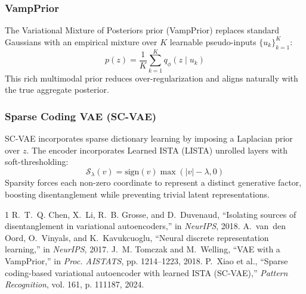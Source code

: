 \documentclass[10pt,journal,compsoc]{IEEEtran}
\begin{document}
\subsubsection{VampPrior}
The Variational Mixture of Posteriors prior (VampPrior) replaces standard Gaussians with an empirical mixture over $K$ learnable pseudo-inputs $\{u_k\}_{k=1}^K$:
\begin{equation}
p(z) = \frac{1}{K} \sum_{k=1}^K q_\phi(z \mid u_k)
\end{equation}
This rich multimodal prior reduces over-regularization and aligns naturally with the true aggregate posterior.

\subsubsection{Sparse Coding VAE (SC-VAE)}
SC-VAE incorporates sparse dictionary learning by imposing a Laplacian prior over $z$. The encoder incorporates Learned ISTA (LISTA) unrolled layers with soft-thresholding:
\begin{equation}
\mathcal{S}_\lambda(v) = \text{sign}(v) \max(|v| - \lambda, 0)
\end{equation}
Sparsity forces each non-zero coordinate to represent a distinct generative factor, boosting disentanglement while preventing trivial latent representations.


\begin{thebibliography}{1}
R.~T.~Q. Chen, X.~Li, R.~B. Grosse, and D.~Duvenaud, ``Isolating sources of disentanglement in variational autoencoders,'' in \emph{NeurIPS}, 2018.
A.~van~den Oord, O.~Vinyals, and K.~Kavukcuoglu, ``Neural discrete representation learning,'' in \emph{NeurIPS}, 2017.
J.~M. Tomczak and M.~Welling, ``VAE with a VampPrior,'' in \emph{Proc. AISTATS}, pp. 1214--1223, 2018.
P.~Xiao et al., ``Sparse coding-based variational autoencoder with learned ISTA (SC-VAE),'' \emph{Pattern Recognition}, vol. 161, p. 111187, 2024.
\end{thebibliography}
\end{document}
